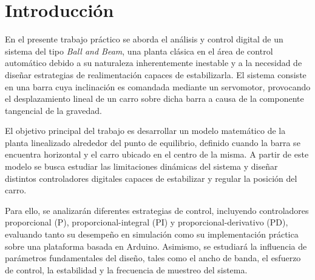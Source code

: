 \documentclass[a4paper,12pt]{article}
\begin{document}
\begin{abstract}
En este trabajo práctico se estudia el modelado, identificación y control digital de un sistema \textit{Ball and Beam}. A partir de mediciones experimentales se obtuvieron modelos para la dinámica servo-barra y barra-carrito, que luego se combinaron para representar la planta completa mediante una función de transferencia y una descripción en espacio de estados. Sobre este modelo se analizaron las principales limitaciones de diseño, incluyendo la frecuencia de muestreo, los márgenes de estabilidad y la saturación de la acción de control. Finalmente, se diseñaron e implementaron controladores P, PI y PD, comparando sus respuestas simuladas y medidas. Los resultados permiten evaluar el compromiso entre velocidad de respuesta, estabilidad, esfuerzo de control y sensibilidad al ruido en la implementación real del sistema.
\end{abstract}

\newpage

\tableofcontents

\newpage

\section{Introducción}

En el presente trabajo práctico se aborda el análisis y control digital de un sistema del tipo \textit{Ball and Beam}, una planta clásica en el área de control automático debido a su naturaleza inherentemente inestable y a la necesidad de diseñar estrategias de realimentación capaces de estabilizarla. El sistema consiste en una barra cuya inclinación es comandada mediante un servomotor, provocando el desplazamiento lineal de un carro sobre dicha barra a causa de la componente tangencial de la gravedad.

El objetivo principal del trabajo es desarrollar un modelo matemático de la planta linealizado alrededor del punto de equilibrio, definido cuando la barra se encuentra horizontal y el carro ubicado en el centro de la misma. A partir de este modelo se busca estudiar las limitaciones dinámicas del sistema y diseñar distintos controladores digitales capaces de estabilizar y regular la posición del carro.

Para ello, se analizarán diferentes estrategias de control, incluyendo controladores proporcional (P), proporcional-integral (PI) y proporcional-derivativo (PD), evaluando tanto su desempeño en simulación como su implementación práctica sobre una plataforma basada en Arduino. Asimismo, se estudiará la influencia de parámetros fundamentales del diseño, tales como el ancho de banda, el esfuerzo de control, la estabilidad y la frecuencia de muestreo del sistema.
\end{document}
